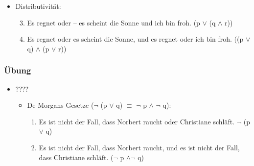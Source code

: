 {\begin{frame}
\begin{itemize}
\begin{itemize}
		\item Distributivität:
	
		\begin{enumerate}\setcounter{enumi}{2}
			\item Es regnet oder -- es scheint die Sonne und ich bin froh. (p  $\lor$ (q $\land$ r))
			
			\item Es regnet oder es scheint die Sonne, und es regnet oder ich bin froh. ((p $\lor$ q) $\land$ (p $\lor$ r))
		\end{enumerate}

	\end{itemize}

\end{itemize}



\end{frame}



\begin{frame}
\frametitle{Übung}

\begin{itemize}
\item ????

	\begin{itemize}
		\item De Morgans Gesetze ($\lnot$ (p $\lor$ q) $\equiv$ $\lnot$ p $\land$ $\lnot$ q):
	
		\begin{enumerate}
			\item Es ist nicht der Fall, dass Norbert raucht oder Christiane schläft. $\lnot$ (p $\lor$ q)
			
			\item Es ist nicht der Fall, dass Norbert raucht, und es ist nicht der Fall, dass Christiane schläft. ($\lnot$ p $\land \lnot$ q)
		\end{enumerate}
		
	\end{itemize}

\end{itemize}


\end{frame}
}



